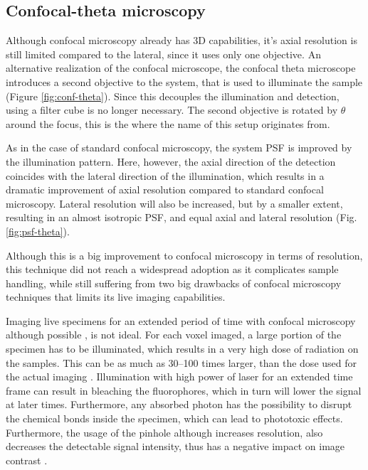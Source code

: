   \subsection{Confocal-theta microscopy}

    Although confocal microscopy already has 3D capabilities, it's axial resolution is still limited compared to the lateral, since it uses only one objective. An alternative realization of the confocal microscope, the confocal theta microscope \cite{stelzer_fundamental_1994} introduces a second objective to the system, that is used to illuminate the sample (Figure \ref{fig:conf-theta}). Since this decouples the illumination and detection, using a filter cube is no longer necessary. The second objective is rotated by $\theta$ around the focus, this is the where the name of this setup originates from.

    As in the case of standard confocal microscopy, the system PSF is improved by the illumination pattern. Here, however, the axial direction of the detection coincides with the lateral direction of the illumination, which results in a dramatic improvement of axial resolution compared to standard confocal microscopy. Lateral resolution will also be increased, but by a smaller extent, resulting in an almost isotropic PSF, and equal axial and lateral resolution (Fig. \ref{fig:psf-theta}). 

    Although this is a big improvement to confocal microscopy in terms of resolution, this technique did not reach a widespread adoption as it complicates sample handling, while still suffering from two big drawbacks of confocal microscopy techniques that limits its live imaging capabilities.

    Imaging live specimens for an extended period of time with confocal microscopy although possible \cite{aldaz_live_2010, maitre_asymmetric_2016}, is not ideal. For each voxel imaged, a large portion of the specimen has to be illuminated, which results in a very high dose of radiation on the samples. This can be as much as 30--100 times larger, than the dose used for the actual imaging \cite{reynaud_light_2008}. Illumination with high power of laser for an extended time frame can result in bleaching the fluorophores, which in turn will lower the signal at later times. Furthermore, any absorbed photon has the possibility to disrupt the chemical bonds inside the specimen, which can lead to phototoxic effects. Furthermore, the usage of the pinhole although increases resolution, also decreases the detectable signal intensity, thus has a negative impact on image contrast \cite{stelzer_contrast_1998}.

